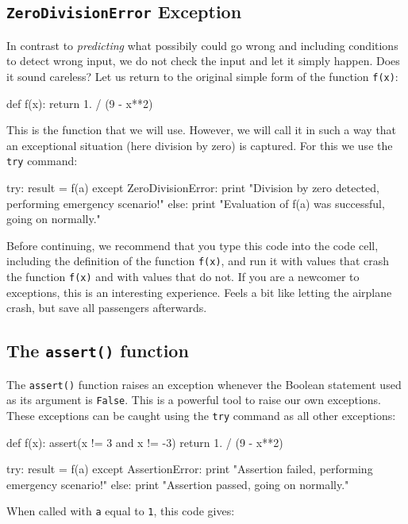 \subsection{{\tt ZeroDivisionError} Exception}

In contrast 
to {\em predicting} what possibily could go wrong and including conditions to detect wrong 
input, we do not check the input and let it simply happen. Does it sound careless? Let us 
return to the original simple form of the function {\tt f(x)}:

\begin{bluecode}
def f(x):
    return 1. / (9 - x**2)
\end{bluecode}
This is the function that we will use. However, we will call it in such a way that 
an exceptional situation (here division by zero) is captured. For this we use the 
{\tt try} command:
 
\begin{bluecode}
try:
    result = f(a)
except ZeroDivisionError:
    print "Division by zero detected, performing emergency scenario!"
else:
    print "Evaluation of f(a) was successful, going on normally."
\end{bluecode}
Before continuing, we recommend that you type this code into the code cell,
including the definition of the function {\tt f(x)}, and run it with values
that crash the function {\tt f(x)} and with values that do not. If you are a newcomer to
exceptions, this is an interesting experience. Feels a bit like letting the
airplane crash, but save all passengers afterwards.
 
\subsection{The {\tt assert()} function}

The {\tt assert()} function raises an exception whenever the Boolean 
statement used as its argument is {\tt False}. This is a powerful tool to raise our own 
exceptions. These exceptions can be caught using the {\tt try} command 
as all other exceptions:

\begin{bluecode}
def f(x):
    assert(x != 3 and x != -3)
    return 1. / (9 - x**2)

try:
    result = f(a)
except AssertionError:
    print "Assertion failed, performing emergency scenario!"
else:
    print "Assertion passed, going on normally."
\end{bluecode}
When called with {\tt a} equal to {\tt 1}, this code gives:

